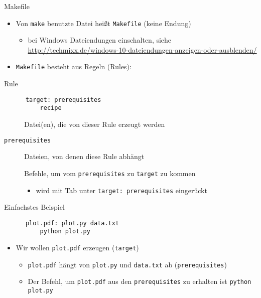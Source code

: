 \begin{frame}[fragile]{Makefile}
  \begin{itemize}
    \item Von \texttt{make} benutzte Datei heißt \texttt{Makefile} (keine Endung)
      \begin{itemize}
        \item bei Windows Dateiendungen einschalten, siehe
          \url{http://techmixx.de/windows-10-dateiendungen-anzeigen-oder-ausblenden/}
      \end{itemize}
    \item \texttt{Makefile} besteht aus Regeln (Rules):
  \end{itemize}
  \begin{block}{Rule}
    \centering
    \begin{verbatim}
      target: prerequisites
          recipe
    \end{verbatim}
  \end{block}
  \begin{description}
    \item[\texttt{\hphantom{prerequisites}}] Datei(en), die von dieser Rule erzeugt werden
    \item[\texttt{prerequisites}]                         Dateien, von denen diese Rule abhängt
    \item[\texttt{\hphantom{prerequisites}}] Befehle, um vom \texttt{prerequisites} zu \texttt{target} zu kommen
    \begin{itemize}
      \item wird mit Tab unter \texttt{target: prerequisites} eingerückt
    \end{itemize}
  \end{description}
\end{frame}

\begin{frame}[fragile]{Einfachstes Beispiel}
  \begin{center}
    \begin{verbatim}
      plot.pdf: plot.py data.txt
          python plot.py
    \end{verbatim}
  \end{center}
  \begin{itemize}
    \item Wir wollen \texttt{plot.pdf} erzeugen (\texttt{target})
    \begin{itemize}
      \item \texttt{plot.pdf} hängt von \texttt{plot.py} und \texttt{data.txt} ab (\texttt{prerequisites})
      \item Der Befehl, um \texttt{plot.pdf} aus den \texttt{prerequisites} zu erhalten ist \texttt{python plot.py}
    \end{itemize}
  \end{itemize}
\end{frame}

